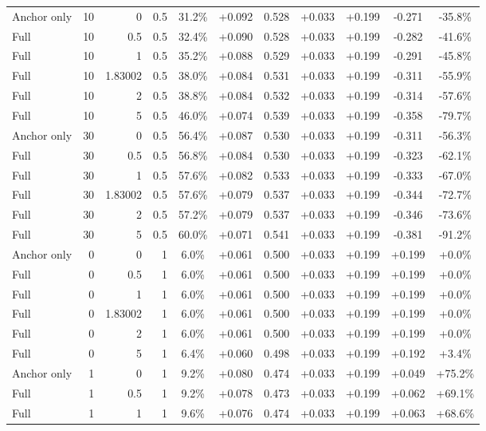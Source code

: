 \begin{table}[htbp]
\begin{tabular}{lrrrccccccc}
Anchor only & 10 & 0 & 0.5 & 31.2\% & +0.092 & 0.528 & +0.033 & +0.199 & -0.271 & -35.8\% \\
Full & 10 & 0.5 & 0.5 & 32.4\% & +0.090 & 0.528 & +0.033 & +0.199 & -0.282 & -41.6\% \\
Full & 10 & 1 & 0.5 & 35.2\% & +0.088 & 0.529 & +0.033 & +0.199 & -0.291 & -45.8\% \\
Full & 10 & 1.83002 & 0.5 & 38.0\% & +0.084 & 0.531 & +0.033 & +0.199 & -0.311 & -55.9\% \\
Full & 10 & 2 & 0.5 & 38.8\% & +0.084 & 0.532 & +0.033 & +0.199 & -0.314 & -57.6\% \\
Full & 10 & 5 & 0.5 & 46.0\% & +0.074 & 0.539 & +0.033 & +0.199 & -0.358 & -79.7\% \\
Anchor only & 30 & 0 & 0.5 & 56.4\% & +0.087 & 0.530 & +0.033 & +0.199 & -0.311 & -56.3\% \\
Full & 30 & 0.5 & 0.5 & 56.8\% & +0.084 & 0.530 & +0.033 & +0.199 & -0.323 & -62.1\% \\
Full & 30 & 1 & 0.5 & 57.6\% & +0.082 & 0.533 & +0.033 & +0.199 & -0.333 & -67.0\% \\
Full & 30 & 1.83002 & 0.5 & 57.6\% & +0.079 & 0.537 & +0.033 & +0.199 & -0.344 & -72.7\% \\
Full & 30 & 2 & 0.5 & 57.2\% & +0.079 & 0.537 & +0.033 & +0.199 & -0.346 & -73.6\% \\
Full & 30 & 5 & 0.5 & 60.0\% & +0.071 & 0.541 & +0.033 & +0.199 & -0.381 & -91.2\% \\
Anchor only & 0 & 0 & 1 & 6.0\% & +0.061 & 0.500 & +0.033 & +0.199 & +0.199 & +0.0\% \\
Full & 0 & 0.5 & 1 & 6.0\% & +0.061 & 0.500 & +0.033 & +0.199 & +0.199 & +0.0\% \\
Full & 0 & 1 & 1 & 6.0\% & +0.061 & 0.500 & +0.033 & +0.199 & +0.199 & +0.0\% \\
Full & 0 & 1.83002 & 1 & 6.0\% & +0.061 & 0.500 & +0.033 & +0.199 & +0.199 & +0.0\% \\
Full & 0 & 2 & 1 & 6.0\% & +0.061 & 0.500 & +0.033 & +0.199 & +0.199 & +0.0\% \\
Full & 0 & 5 & 1 & 6.4\% & +0.060 & 0.498 & +0.033 & +0.199 & +0.192 & +3.4\% \\
Anchor only & 1 & 0 & 1 & 9.2\% & +0.080 & 0.474 & +0.033 & +0.199 & +0.049 & +75.2\% \\
Full & 1 & 0.5 & 1 & 9.2\% & +0.078 & 0.473 & +0.033 & +0.199 & +0.062 & +69.1\% \\
Full & 1 & 1 & 1 & 9.6\% & +0.076 & 0.474 & +0.033 & +0.199 & +0.063 & +68.6\% \\

\end{tabular}
\end{table}
